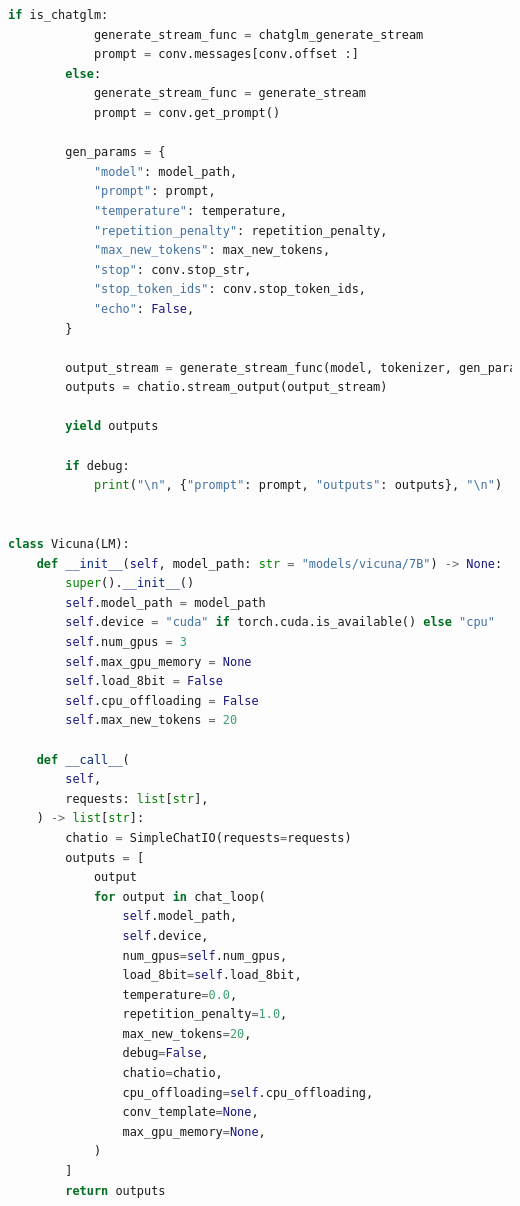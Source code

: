 \documentclass[a4paper,12pt]{article}
\begin{document}
\begin{lstlisting}[language=Python]
        if is_chatglm:
            generate_stream_func = chatglm_generate_stream
            prompt = conv.messages[conv.offset :]
        else:
            generate_stream_func = generate_stream
            prompt = conv.get_prompt()

        gen_params = {
            "model": model_path,
            "prompt": prompt,
            "temperature": temperature,
            "repetition_penalty": repetition_penalty,
            "max_new_tokens": max_new_tokens,
            "stop": conv.stop_str,
            "stop_token_ids": conv.stop_token_ids,
            "echo": False,
        }

        output_stream = generate_stream_func(model, tokenizer, gen_params, device)
        outputs = chatio.stream_output(output_stream)

        yield outputs

        if debug:
            print("\n", {"prompt": prompt, "outputs": outputs}, "\n")


class Vicuna(LM):
    def __init__(self, model_path: str = "models/vicuna/7B") -> None:
        super().__init__()
        self.model_path = model_path
        self.device = "cuda" if torch.cuda.is_available() else "cpu"
        self.num_gpus = 3
        self.max_gpu_memory = None
        self.load_8bit = False
        self.cpu_offloading = False
        self.max_new_tokens = 20

    def __call__(
        self,
        requests: list[str],
    ) -> list[str]:
        chatio = SimpleChatIO(requests=requests)
        outputs = [
            output
            for output in chat_loop(
                self.model_path,
                self.device,
                num_gpus=self.num_gpus,
                load_8bit=self.load_8bit,
                temperature=0.0,
                repetition_penalty=1.0,
                max_new_tokens=20,
                debug=False,
                chatio=chatio,
                cpu_offloading=self.cpu_offloading,
                conv_template=None,
                max_gpu_memory=None,
            )
        ]
        return outputs
\end{lstlisting}
\end{document}
